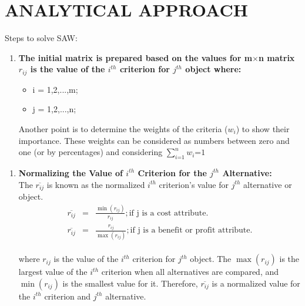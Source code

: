 \documentclass[serif, aspectratio=169]{beamer}
\newtheorem{thm co}{Theorem contd...}
\begin{document}
\section{ANALYTICAL APPROACH }
\begin{frame}{Steps to solve SAW:}
\begin{enumerate}
\item \textbf{The initial matrix is prepared based on the values for m$\times$n matrix $r_{ij}$ is the value of the $i^{th}$ criterion for $j^{th}$ object where:}
\vspace{3mm}
\begin{itemize}
    \item i = 1,2,...,m;
    \vspace{1mm}
    \item j = 1,2,...,n;
\end{itemize}
\vspace{3mm}
\hspace{1em}Another point is to determine the weights of the criteria ($w_{i}$) to show their importance. These weights can be considered as numbers between zero and one (or by percentages) and considering $\sum\limits^{n}_{i\text{=}1}w_{i}\text{=}1$\\
\end{enumerate}
\end{frame}

\begin{frame}
    \begin{enumerate}
\item \textbf{Normalizing the Value of $i^{th}$ Criterion for the $j^{th}$ Alternative:}\\ 
\hspace{1em}The $\overline{r_{ij}}$ is known as the normalized $i^{th}$ criterion’s value for $j^{th}$ alternative or object.\\
\vspace{-7mm}
\begin{eqnarray*}
\overline{r_{ij}}&\text{=}&\frac{\min (r_{ij})}{r_{ij}} ; \text{if j is a cost attribute.}\\
\overline{r_{ij}}&\text{=}&\frac{r_{ij}}{\max(r_{ij})} ; \text{if j is a benefit or profit attribute.}
\end{eqnarray*}\\
\vspace{-2mm}
\hspace{1em}where $r_{ij}$ is the value of the $i^{th}$ criterion for $j^{th}$ object. The $\max (r_{ij})$ is the largest value of the $i^{th}$ criterion when all alternatives are compared, and $\min (r_{ij})$ is the smallest value for it. Therefore,
 $\overline{r_{ij}}$ is a normalized value for the $i^{th}$ criterion and $j^{th}$
alternative.\\
\end{enumerate}
\end{frame}
\end{document}
